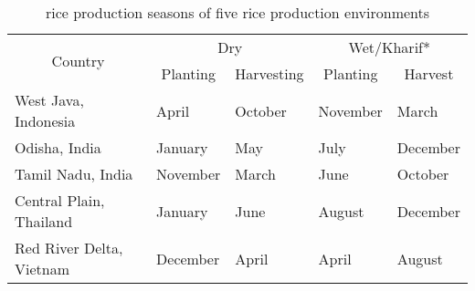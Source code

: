\begin{table}
\centering
\caption{rice production seasons of five rice production environments}
\label{table:riceproduction_season}
\begin{tabular}{lllll}
\hline
\multicolumn{1}{c}{\multirow{2}{*}{Country}} & \multicolumn{2}{c}{Dry}                                       & \multicolumn{2}{c}{Wet/Kharif*}                            \\
\cline{2-5}
\multicolumn{1}{c}{}                         & \multicolumn{1}{c}{Planting} & \multicolumn{1}{c}{Harvesting} & \multicolumn{1}{c}{Planting} & \multicolumn{1}{c}{Harvest} \\
\hline
West Java, Indonesia                                    & April                        & October                        & November                     & March                       \\
Odisha, India                                        & January                     & May                            & July                          & December                     \\
Tamil Nadu, India                                        & November                     & March                            & June                          & October                     \\
Central Plain, Thailand                                     & January                      & June                           & August                       & December                    \\
Red River Delta, Vietnam                                      & December                     & April                          & April                        & August      \\
\hline               
\end{tabular}
\end{table}